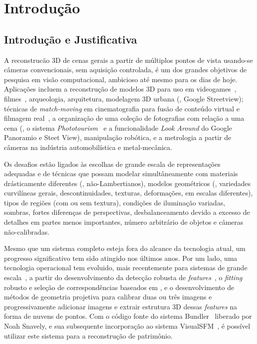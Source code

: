 \chapter*{Introdução} \label{cap:intro}

\section{Introdução e Justificativa}

A reconstrucão 3D de cenas gerais a partir de múltiplos pontos de vista
usando-se câmeras convencionais, sem aquisição controlada, é um dos grandes
objetivos de pesquisa em visão computacional, ambicioso até mesmo para os dias
de hoje. Aplicações incluem a reconstrução de modelos 3D para uso em
videogames~\cite{Ablan:3DPhoto:book}, filmes~\cite{Ablan:3DPhoto:book},
arqueologia, arquitetura, modelagem 3D urbana (\eg, Google Streetview); técnicas
de \emph{match-moving} em cinematografia para fusão de conteúdo virtual e
filmagem real~\cite{Dobbert:Matchmoving:book}, a organização de uma coleção de
fotografias com relação a uma cena (\eg, o sistema
\emph{Phototourism}~\cite{Argarwal:Snavely:etal:ICCV09} e a funcionalidade
\emph{Look Around} do Google Panoramio e Steet View), manipulação robótica, e a
metrologia a partir de câmeras na indústria automobilística e metal-mecânica.

Os desafios estão ligados às escolhas de grande escala de
representações adequadas e de técnicas que possam modelar simultâneamente com
materiais drásticamente diferentes (\eg, não-Lambertianos), modelos
geométricos (\eg, variedades curvilíneas gerais, descontinuidades, texturas,
deformações, em escalas diferentes), tipos de regiões (com ou sem textura),
condições de iluminação variadas, sombras, fortes diferenças de perspectivas,
desbalanceamento devido a excesso de detalhes em partes menos importantes,
número arbitrário de objetos e câmeras não-calibradas.

Mesmo que um sistema completo esteja fora do alcance da tecnologia atual,
um progresso significativo tem sido atingido nos últimos anos. Por um lado,
uma tecnologia operacional tem evoluido, mais recentemente para sistemas de grande
escala~\cite{Argarwal:Snavely:etal:ICCV09,Pollefeys:VanGool:etal:handheld:IJCV2004},
a partir do desenvolvimento da detecção robusta de
\emph{features}~\cite{mikolajczyk:schmid:IJCV04}, o
\emph{fitting} robusto e seleção de correspondências baseados em \ransac, e o
desenvolvimento de métodos de geometria projetiva para calibrar duas ou três
imagens e progressivamente adicionar imagens e extrair estrutura 3D dessas
\emph{features} na forma de nuvens de pontos. Com o código fonte do sistema
Bundler~\cite{Noah:Bundler,Noah:Steven:Bundler} liberado por Noah Snavely, e sua subsequente incorporação
ao sistema VisualSFM~\cite{Changchang:VisualSFM}, é possível utilizar este sistema para a
reconstrução de patrimônio. 


